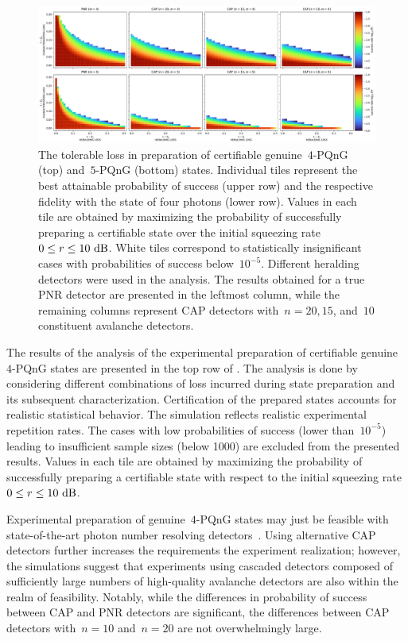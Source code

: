 \documentclass{optica-article}
\begin{document}
\begin{figure}[h]
  \bgroup
    \hspace*{-0.125\columnwidth}%
    \includegraphics[width = 1.25 \columnwidth]{import/202504/paper_unified_merged_10dB-51.pdf}
  \egroup
  \caption{
    The tolerable loss in preparation of certifiable genuine~$4$-PQnG ({top}) and~$5$-PQnG ({bottom}) states. Individual tiles represent the best attainable probability of success (upper row) and the respective fidelity with the state of four photons (lower row). Values in each tile are obtained by maximizing the probability of successfully preparing a certifiable state over the initial squeezing rate~${0 \leq r \leq 10\ \mathrm{dB}}$. White tiles correspond to statistically insignificant cases with probabilities of success below~$10^{-5}$. Different heralding detectors were used in the analysis. The results obtained for a true PNR detector are presented in the leftmost column, while the remaining columns represent CAP detectors with~${n = 20, 15}$, and~$10$ constituent avalanche detectors.
  }
  \label{f-res-45}
\end{figure}

The results of the analysis of the experimental preparation of certifiable genuine~$4$-PQnG states are presented in the {top} row of . The analysis is done by considering different combinations of loss incurred during state preparation and its subsequent characterization. Certification of the prepared states accounts for realistic statistical behavior. The simulation reflects realistic experimental repetition rates. The cases with low probabilities of success (lower than~$10^{-5}$) leading to insufficient sample sizes (below 1000) are excluded from the presented results. Values in each tile are obtained by maximizing the probability of successfully preparing a certifiable state with respect to the initial squeezing rate~${0 \leq r \leq 10\ \mathrm{dB}}$.

Experimental preparation of genuine~$4$-PQnG states may just be feasible with state-of-the-art photon number resolving detectors~\cite{endo2021,endo2024}. Using alternative CAP detectors further increases the requirements  the experiment realization; however, the simulations suggest that experiments using cascaded detectors composed of sufficiently large numbers of high-quality avalanche detectors are also within the realm of feasibility. Notably, while the differences in probability of success between CAP and PNR detectors are significant, the differences between CAP detectors with~$n = 10$ and~$n = 20$ are not overwhelmingly large.
\end{document}
